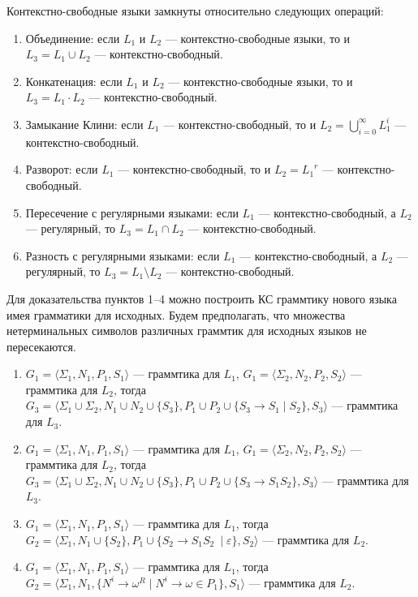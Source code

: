 \begin{theorem}
Контекстно-свободные языки замкнуты относительно следующих операций:
\begin{enumerate}
  \item Объединение: если $L_1$ и $L_2$ --- контекстно-свободные языки, то и $L_3 = L_1 \cup L_2$ --- контекстно-свободный.
  \item Конкатенация: если $L_1$ и $L_2$ --- контекстно-свободные языки, то и $L_3 = L_1 \cdot L_2$ --- контекстно-свободный.
  \item Замыкание Клини: если $L_1$ --- контекстно-свободный, то и $L_2 = \bigcup\limits_{i=0}^{\infty} L_1^i $ --- контекстно-свободный.
  \item Разворот: если $L_1$ --- контекстно-свободный, то и $L_2 = {L_1}^r$ --- контекстно-свободный.
  \item Пересечение с регулярными языками: если $L_1$ --- контекстно-свободный, а $L_2$ --- регулярный, то  $L_3 = L_1 \cap L_2$ --- контекстно-свободный.
  \item Разность с регулярными языками: если $L_1$ --- контекстно-свободный, а $L_2$ --- регулярный, то  $L_3 = L_1 \setminus L_2$ --- контекстно-свободный.
\end{enumerate}
\end{theorem}
Для доказательства пунктов 1--4 можно построить КС граммтику нового языка имея грамматики для исходных. 
Будем предполагать, что множества нетерминальных символов различных граммтик для исходных языков не пересекаются.
\begin{enumerate}
\item $G_1=\langle\Sigma_1,N_1,P_1,S_1\rangle$ --- граммтика для $L_1$, $G_1=\langle\Sigma_2,N_2,P_2,S_2\rangle$ --- граммтика для $L_2$, тогда $G_3=\langle\Sigma_1 \cup \Sigma_2, N_1 \cup N_2 \cup \{S_3\}, P_1 \cup P_2 \cup \{S_3 \to S_1 \mid S_2\} ,S_3\rangle$ --- граммтика для $L_3$. 

\item $G_1=\langle\Sigma_1,N_1,P_1,S_1\rangle$ --- граммтика для $L_1$, $G_1=\langle\Sigma_2,N_2,P_2,S_2\rangle$ --- граммтика для $L_2$, тогда $G_3=\langle\Sigma_1 \cup \Sigma_2, N_1 \cup N_2 \cup \{S_3\}, P_1 \cup P_2 \cup \{S_3 \to S_1 S_2\} ,S_3\rangle$ --- граммтика для $L_3$. 

\item $G_1=\langle\Sigma_1,N_1,P_1,S_1\rangle$ --- граммтика для $L_1$, тогда $G_2=\langle\Sigma_1, N_1 \cup \{S_2\}, P_1 \cup \{S_2 \to S_1 S_2\ \mid \varepsilon\}, S_2\rangle$ --- граммтика для $L_2$. 

\item $G_1=\langle\Sigma_1,N_1,P_1,S_1\rangle$ --- граммтика для $L_1$, тогда $G_2=\langle\Sigma_1, N_1, \{N^i \to \omega^R \mid N^i \to \omega \in P_1 \}, S_1\rangle$ --- граммтика для $L_2$. 
\end{enumerate}

